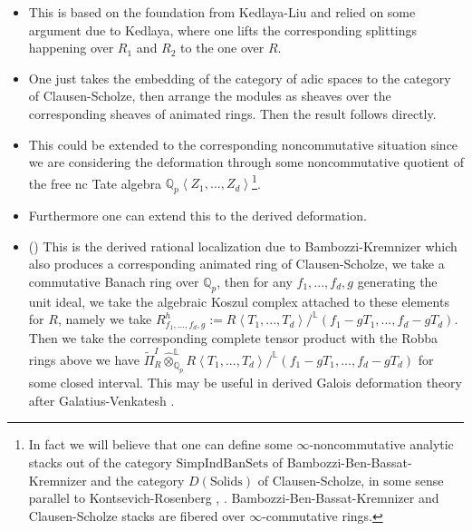 \documentclass[11pt]{report}
\begin{document}
\begin{itemize}
\justifying
\item<5-> This is based on the foundation from Kedlaya-Liu and relied on some argument due to Kedlaya, where one lifts the corresponding splittings happening over $R_1$ and $R_2$ to the one over $R$.
\item<6-> One just takes the embedding of the category of adic spaces to the category of Clausen-Scholze, then arrange the modules as sheaves over the corresponding sheaves of animated rings. Then the result follows directly.
\item<7-> This could be extended to the corresponding noncommutative situation since we are considering the deformation through some noncommutative quotient of the free nc Tate algebra $\mathbb{Q}_p\left<Z_1,...,Z_d\right>$\footnote{\justifying In fact we will believe that one can define some $\infty$-noncommutative analytic stacks out of the category $\mathrm{Simp}\mathrm{Ind}\mathrm{BanSets}$ of Bambozzi-Ben-Bassat-Kremnizer and the category $D(\mathrm{Solids})$ of Clausen-Scholze, in some sense parallel to Kontsevich-Rosenberg \cite{3KR1}, \cite{3KR2}. Bambozzi-Ben-Bassat-Kremnizer and Clausen-Scholze stacks are fibered over $\infty$-commutative rings.}. 
\item<8-> Furthermore one can extend this to the derived deformation.  

\item<9-> ()
This is the derived rational localization due to Bambozzi-Kremnizer which also produces a corresponding animated ring of Clausen-Scholze, we take a commutative Banach ring over $\mathbb{Q}_p$, then for any $f_1,...,f_d,g$ generating the unit ideal, we take the algebraic Koszul complex attached to these elements for $R$, namely we take $R^h_{f_1,...,f_d,g}:=R\left<T_1,...,T_d\right>/^\mathbb{L}(f_1-gT_1,...,f_d-gT_d)$. Then we take the corresponding complete tensor product with the Robba rings above we have $\widetilde{\Pi}^I_{R}\widehat{\otimes}_{\mathbb{Q}_p}^\mathbb{L}R\left<T_1,...,T_d\right>/^\mathbb{L}(f_1-gT_1,...,f_d-gT_d)$ for some closed interval. This may be useful in derived Galois deformation theory after Galatius-Venkatesh \cite{GV}.



	
\end{itemize}
	
\end{document}
